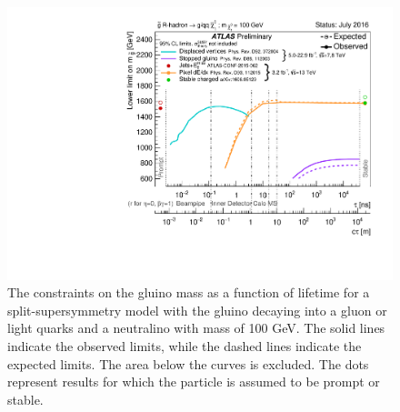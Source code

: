 \begin{figure}[htbp]
\centering
\includegraphics[width=\fullfig]{figures/combined_rhadrons.pdf}  
\caption{The constraints on the gluino mass as a function of lifetime for a split-supersymmetry model with the gluino \rhadrons decaying into a gluon or light quarks and a neutralino with mass of 100 GeV. The solid lines indicate the observed limits, while the dashed lines indicate the expected limits. The area below the curves is excluded. The dots represent results for which the particle is assumed to be prompt or stable.}
\label{fig:combined_rhadrons}
\end{figure}


